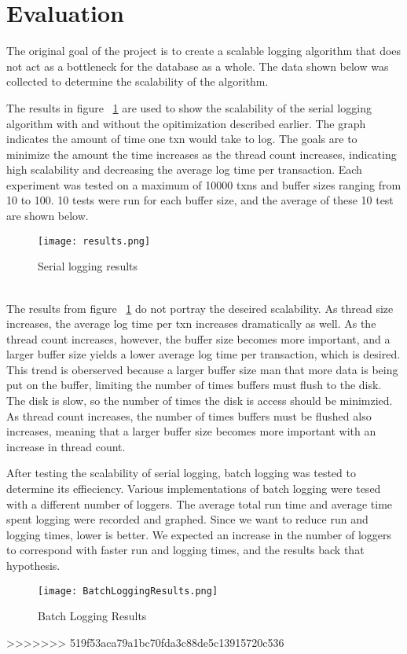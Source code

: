 \section{Evaluation}


The original goal of the project is to create a scalable logging algorithm that does not act as a bottleneck for the database as a whole. The data shown below was collected to determine the scalability of the algorithm. \par

The results in figure ~\ref{serialresults} are used to show the scalability of the serial logging algorithm with and without the  opitimization described earlier.  The graph indicates the amount of time one txn would take to log. The goals are to minimize the amount the time increases as the thread count increases, indicating high scalability and decreasing the average log time per transaction. Each experiment  was tested on a maximum of 10000 txns and buffer sizes ranging from 10 to 100. 10 tests were run for each buffer size, and the average of these 10 test are shown below. \par 

\begin{figure}[!h]
  \texttt{[image: results.png]}
  \caption{Serial logging results}
  \label{serialresults}
\end{figure}\\

The results from figure ~\ref{serialresults} do not portray the deseired scalability. As thread size increases, the average log time per txn increases dramatically as well. As the thread count increases, however, the buffer size becomes more important, and a larger buffer size yields a lower average log time per transaction, which is desired. This trend is oberserved because a larger buffer size man that more data is being put on the buffer, limiting the number of times buffers must flush to the disk. The disk is slow, so the number of times the disk is access should be minimzied. As thread count increases, the number of times buffers must be flushed also increases, meaning that a larger buffer size becomes more important with an increase in thread count. \par

After testing the scalability of serial logging, batch logging was tested to determine its effieciency. Various implementations of batch logging were tesed with a different number of loggers. The average total run time and average time spent logging were recorded and graphed. Since we want to reduce run and logging times, lower is better. We expected an increase in the number of loggers to correspond with faster run and logging times, and the results back that hypothesis.
\begin{figure}
	\caption{Batch Logging Results}
	\texttt{[image: BatchLoggingResults.png]}
\end{figure}
>>>>>>> 519f53aca79a1bc70fda3c88de5c13915720c536
